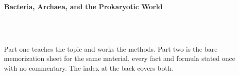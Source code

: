 



\makeindex[title={Index of This Volume},columns=2,intoc]

\begin{titlepage}\thispagestyle{empty}
\vspace*{0.14\textheight}
\noindent{\color{tiercore}\rule{\textwidth}{5pt}}\\[3pt]
\noindent{\color{bioline}\rule{\textwidth}{1pt}}\\[26pt]
\\[12pt]
\noindent\begin{minipage}{\textwidth}\raggedright
{\sffamily\bfseries\fontsize{28}{32}\selectfont\color{bioink}%
 \hyphenchar{} Bacteria, Archaea, and the Prokaryotic World\par}\end{minipage}\\[16pt]
\noindent{\color{biogreen}\rule{\textwidth}{1.4pt}}\\[10pt]
\noindent\begin{minipage}{\textwidth}\raggedright
{\fontsize{10.5}{14}\selectfont\color{biogreen}%
Part one teaches the topic and works the methods. Part two is the bare memorization sheet for the
same material, every fact and formula stated once with no commentary. The index at the back covers both.\par}\end{minipage}
\vfill
\noindent{\color{bioline}\rule{\textwidth}{1pt}}\\[3pt]
\noindent{\color{tiercore}\rule{\textwidth}{5pt}}
\end{titlepage}
\tableofcontents
\clearpage
{}
\clearpage
\printindex

